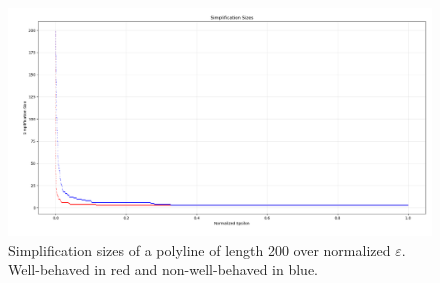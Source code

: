 \begin{figure}[b]
  \centering
	\includegraphics[scale=0.4]{./figures/vary_e200.png}
  \caption{Simplification sizes of a polyline of length 200 over normalized \(\varepsilon\). Well-behaved in red and non-well-behaved in blue.}
  \label{fig:vary_e200}
\end{figure}


\label{ssubsec:simplification_size}

